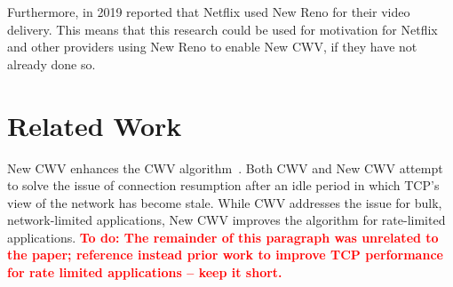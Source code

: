 \documentclass[10pt,sigconf]{acmart}
\newcommand{\todo}[1]{\textbf{\textcolor{red}{To do: #1}}}
\begin{document}
 Furthermore, in 2019 \cite{Mishra-2019-the-great-internet-tcp-congestion-control-census} reported that Netflix used New Reno for their video delivery. This means that this research could be used for motivation for Netflix and other providers using New Reno to enable New CWV, if they have not already done so.
 
\section{Related Work}
\label{sec:related}

New CWV enhances the CWV algorithm~\cite{rfc2861-2000-padhye-congestion-window-validation}.
Both CWV and New CWV attempt to solve the issue of connection resumption after
an idle period in which TCP's view of the network has become stale. While CWV
addresses the issue for bulk, network-limited applications, New CWV improves
the algorithm for rate-limited applications.
\todo{The remainder of this paragraph was unrelated to the paper; reference
instead prior work to improve TCP performance for rate limited applications --
keep it short.}
\end{document}
